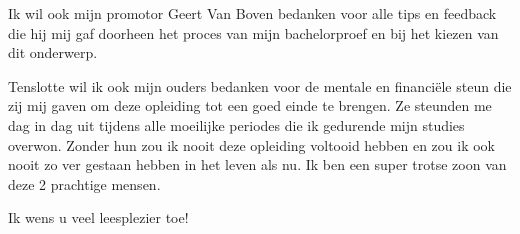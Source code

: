 Ik wil ook mijn promotor Geert Van Boven bedanken voor alle tips en feedback die hij mij gaf doorheen het proces van mijn bachelorproef en bij het kiezen van dit onderwerp.

Tenslotte wil ik ook mijn ouders bedanken voor de mentale en financiële steun die zij mij gaven om deze opleiding tot een goed einde te brengen. Ze steunden me dag in dag uit tijdens alle moeilijke periodes die ik gedurende mijn studies overwon. Zonder hun zou ik nooit deze opleiding voltooid hebben en zou ik ook nooit zo ver gestaan hebben in het leven als nu. Ik ben een super trotse zoon van deze 2 prachtige mensen.

Ik wens u veel leesplezier toe!
